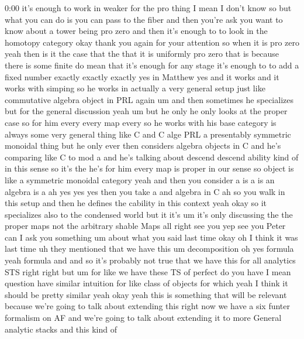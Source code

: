 \begin{unfinished}{0:00}
it's  enough  to  work  in
weaker  for  the  pro  thing  I
mean  I  don't  know  so  but  what  you  can  do
is  you  can  pass  to  the  fiber  and  then
you're  ask  you  want  to  know  about  a
tower  being  pro  zero  and  then  it's
enough
to  to  look  in  the  homotopy
category
okay  thank  you  again  for  your
attention  so  when  it  is  pro  zero  yeah
then  is  it  the  case  that  the  that  it  is
uniformly  pro  zero  that  is  because  there
is  some  finite  do  mean  that  it's  enough
for  any  stage  it's  enough  to  to  add  a
fixed  number  exactly  exactly  exactly  yes
in  Matthew  yes  and  it  works  and  it  works
with  simping  so  he  works  in  actually  a
very  general
setup  just  like  commutative  algebra
object  in  PRL  again  um  and  then
sometimes  he  specializes  but  for  the
general  discussion
yeah  um  but  he  only  he  only  looks  at  the
proper  case  so  for  him  every  every  map
every  so  he  works  with  his  base  category
is  always  some  very  general  thing  like  C
and  C  alge  PRL  a  presentably  symmetric
monoidal  thing  but  he  only  ever  then
considers  algebra  objects  in  C  and  he's
comparing  like  C  to  mod  a  and  he's
talking  about  descend  descend  ability
kind  of  in  this  sense  so  it's  the  he's
for  him  every  map  is  proper  in  our  sense
so
object  is  like  a  symmetric  monoidal
category  yeah  and  then  you
consider
a  is
a  is  an  algebra  is  a  ah  yes  yes  yes  then
you  take  a  and  algebra  in
C  ah  so  you  walk  in  this  setup  and  then
he  defines  the
cability  in
this  context  yeah  okay  so  it  specializes
also  to  the  condensed  world  but  it  it's
um  it's  only  discussing  the  the  proper
maps  not  the  arbitrary  shable
Maps
all  right  see  you  yep  see  you
Peter  can  I  ask  you  something  um  about
what  you  said  last  time  okay  oh  I  think
it  was  last  time  uh  they  mentioned  that
we  have  this  um  decomposition  oh  yes
formula  yeah  formula  and  and  so  it's
probably  not  true  that  we  have  this  for
all  analytics  STS  right  right  but  um  for
like  we  have  these  TS  of
perfect  do  you  have  I  mean  question  have
similar  intuition  for  like  class  of
objects  for  which  yeah  I  think  it  should
be  pretty  similar
yeah  okay  yeah  this  is  something  that
will  be  relevant  because  we're  going  to
talk  about
extending  this  right  now  we  have  a  six
funter  formalism  on  AF  and  we're  going
to  talk  about  extending  it  to  more
General  analytic  stacks  and  this  kind  of

\end{unfinished}

